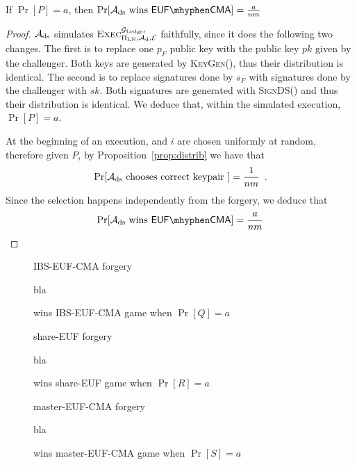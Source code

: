   \begin{proposition}
  \label{prop:forgery:ds}
    If $\Pr[P] = a$, then $\Pr[\adversary_{\mathrm{ds}} \text{ wins }
    \mathsf{EUF \mhyphen CMA}] = \frac{a}{nm}$
  \end{proposition}

  \begin{proof}
    $\mathcal{A}_{\mathrm{ds}}$ simulates
    $\textsc{Exec}^{\mathcal{G}_{\mathrm{Ledger}}}_{\Pi_{\mathrm{LN}}, \mathcal{A}_{\mathrm{d}},
    \mathcal{E}}$ faithfully, since it does the following two changes. The
    first is to replace one $p_F$ public key with the public key $pk$ given by
    the challenger. Both keys are generated by \textsc{KeyGen}(), thus their
    distribution is identical. The second is to replace signatures done by $s_F$
    with signatures done by the challenger with $sk$. Both signatures are
    generated with \textsc{SignDS}() and thus their distribution is identical.
    We deduce that, within the simulated execution, $\Pr[P] = a$.

    At the beginning of an execution, \alice{} and $i$ are chosen uniformly at
    random, therefore given $P$, by Proposition~\ref{prop:distrib} we have that
    \begin{equation*}
      \Pr[\mathcal{A}_{\mathrm{ds}} \text{ chooses correct keypair }] =
      \frac{1}{nm} \enspace.
    \end{equation*}
    Since the selection happens independently from the forgery, we deduce that
    \begin{equation*}
      \Pr[\adversary_{\mathrm{ds}} \text{ wins } \mathsf{EUF \mhyphen CMA}] =
      \frac{a}{nm}
    \end{equation*}
  \end{proof}

  \begin{figure}[H]
    \begin{algobox}{\textsf{IBS-EUF-CMA} forgery}
      \begin{algorithmic}[1]
        \State bla
      \end{algorithmic}
    \end{algobox}
    \caption{wins \textsf{IBS-EUF-CMA} game when $\Pr[Q] = a$}
    \label{alg:forge:ibs}
  \end{figure}

  \begin{figure}[H]
    \begin{algobox}{\textsf{share-EUF} forgery}
      \begin{algorithmic}[1]
        \State bla
      \end{algorithmic}
    \end{algobox}
    \caption{wins \textsf{share-EUF} game when $\Pr[R] = a$}
    \label{alg:forge:share}
  \end{figure}

  \begin{figure}[H]
    \begin{algobox}{\textsf{master-EUF-CMA} forgery}
      \begin{algorithmic}[1]
        \State bla
      \end{algorithmic}
    \end{algobox}
    \caption{wins \textsf{master-EUF-CMA} game when $\Pr[S] = a$}
    \label{alg:forge:master}
  \end{figure}
